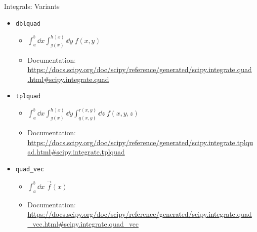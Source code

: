 
\begin{frame}[fragile]{Integrals: Variants}
%
%
\begin{itemize}
\item \texttt{dblquad}
	\begin{itemize}
	\item $\displaystyle \int_{a}^{b} \dd{x} \int_{g(x)}^{h(x)} \dd{y} \; f(x, y)$
	\item Documentation:
		{\scriptsize \url{https://docs.scipy.org/doc/scipy/reference/generated/scipy.integrate.quad.html#scipy.integrate.quad}}
	\end{itemize}
\item \texttt{tplquad}
	\begin{itemize}
	\item $\displaystyle \int_{a}^{b} \dd{x} \int_{g(x)}^{h(x)} \dd{y} \int_{q(x, y)}^{r(x, y)} \dd{z} \;f(x, y, z)$
	\item Documentation:
		{\scriptsize \url{https://docs.scipy.org/doc/scipy/reference/generated/scipy.integrate.tplquad.html#scipy.integrate.tplquad}}
	\end{itemize}
\item \texttt{quad\_vec}
	\begin{itemize}
	\item $\displaystyle \int_{a}^{b} \dd{x} \;\vec{f}(x)$
	\item Documentation: 
		{\scriptsize \url{https://docs.scipy.org/doc/scipy/reference/generated/scipy.integrate.quad_vec.html#scipy.integrate.quad_vec}}
	\end{itemize}
\end{itemize}
%
\end{frame}



